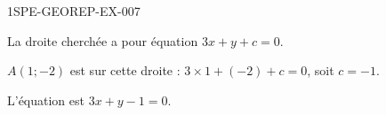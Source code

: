 \begin{corrige}{1SPE-GEOREP-EX-007}


La droite cherchée a pour équation $3x + y + c = 0$.

$A(1 ; -2)$ est sur cette droite : $3 \times 1 + (-2) + c = 0$, soit $c = -1$.

L'équation est $\boxed{3x + y - 1 = 0}$.

\end{corrige}
